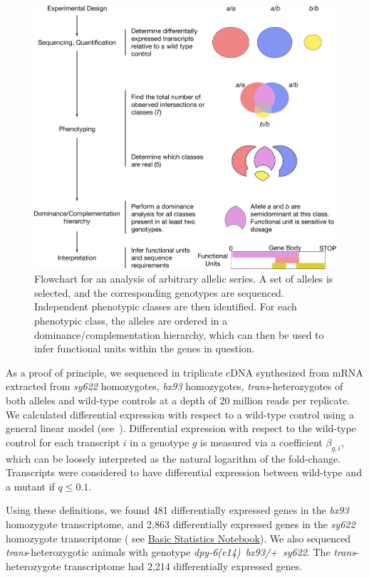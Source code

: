 \documentclass[8pt, twocolumn]{article}
\newcommand{\gene}[1]{\mbox{\emph{#1}}}
\newcommand{\strongn}{2,863}
\newcommand{\weakn}{481}
\newcommand{\transn}{2,214}
\begin{document}
\begin{figure}
  \centering{}
  \includegraphics[width=\textwidth]{../../figs/flowchart.pdf}
  \caption{Flowchart for an analysis of arbitrary allelic series. A set of
  alleles is selected, and the corresponding genotypes are sequenced.
  Independent phenotypic classes are then identified. For each phenotypic class,
  the alleles are ordered in a dominance/complementation hierarchy, which can
  then be used to infer functional units within the genes in question.}
\label{fig:flowchart}
\end{figure}


As a proof of principle, we sequenced in triplicate cDNA synthesized from mRNA
extracted from \emph{sy622} homozygotes, \emph{bx93} homozygotes,
\emph{trans}-heterozygotes of both alleles and wild-type controls at a depth of
20 million reads per replicate. We calculated differential expression with
respect to a wild-type control using a general linear model
(see~). Differential expression with respect to the
wild-type control for each transcript $i$ in a genotype $g$ is measured via a
coefficient $\beta_{g, i}$, which can be loosely interpreted as the natural
logarithm of the fold-change. Transcripts were considered to have differential
expression between wild-type and a mutant if $q\leq 0.1$.

Using these definitions, we found \weakn{} differentially expressed genes in the
\emph{bx93} homozygote transcriptome, and \strongn{} differentially expressed
genes in the \emph{sy622} homozygote transcriptome (
see
\href{https://wormlabcaltech.github.io/med-cafe/notebook/basic.html}{Basic
Statistics Notebook}). We also sequenced \emph{trans}-heterozygotic animals with
genotype \gene{dpy-6(e14) bx93/+ sy622}. The \emph{trans}-heterozygote
transcriptome had \transn{} differentially expressed genes.
\end{document}
